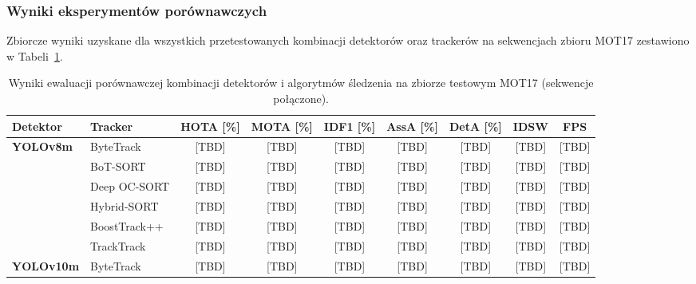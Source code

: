 \subsubsection{Wyniki eksperymentów porównawczych}
Zbiorcze wyniki uzyskane dla wszystkich przetestowanych kombinacji detektorów oraz trackerów na
sekwencjach zbioru MOT17 zestawiono w Tabeli~\ref{tab:mot17_grid_results}.

\begin{table}[htbp]
  \centering
  \caption{Wyniki ewaluacji porównawczej kombinacji detektorów i algorytmów śledzenia na zbiorze testowym MOT17 (sekwencje połączone).}
  \label{tab:mot17_grid_results}
  \small
  \begin{tabular}{llccccccc}
    \toprule
    \textbf{Detektor} & \textbf{Tracker} & \textbf{HOTA} [\%] & \textbf{MOTA} [\%] & \textbf{IDF1} [\%] & \textbf{AssA} [\%] & \textbf{DetA} [\%] & \textbf{IDSW} & \textbf{FPS} \\
    \midrule
    \multirow{6}{*}{\textbf{YOLOv8m}}
                      & ByteTrack        & [TBD]              & [TBD]              & [TBD]              & [TBD]              & [TBD]              & [TBD]         & [TBD]        \\
                      & BoT-SORT         & [TBD]              & [TBD]              & [TBD]              & [TBD]              & [TBD]              & [TBD]         & [TBD]        \\
                      & Deep OC-SORT     & [TBD]              & [TBD]              & [TBD]              & [TBD]              & [TBD]              & [TBD]         & [TBD]        \\
                      & Hybrid-SORT      & [TBD]              & [TBD]              & [TBD]              & [TBD]              & [TBD]              & [TBD]         & [TBD]        \\
                      & BoostTrack++     & [TBD]              & [TBD]              & [TBD]              & [TBD]              & [TBD]              & [TBD]         & [TBD]        \\
                      & TrackTrack       & [TBD]              & [TBD]              & [TBD]              & [TBD]              & [TBD]              & [TBD]         & [TBD]        \\
    \midrule
    \multirow{6}{*}{\textbf{YOLOv10m}}
                      & ByteTrack        & [TBD]              & [TBD]              & [TBD]              & [TBD]              & [TBD]              & [TBD]         & [TBD]        \\

\end{tabular}
\end{table}
